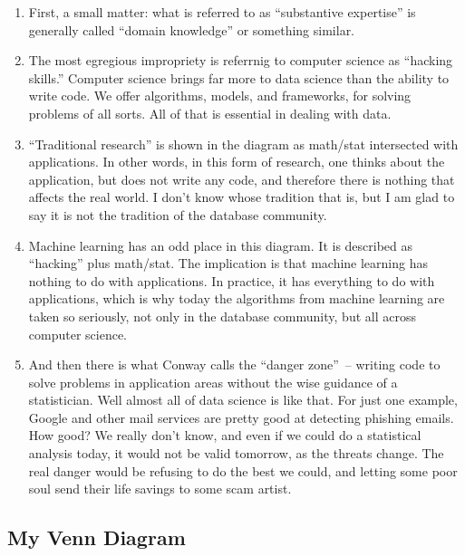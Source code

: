 \documentclass[11pt]{article}
\begin{document}
\begin{enumerate}

\item
First, a small matter: what is referred to as ``substantive expertise'' is generally called ``domain knowledge'' or something similar.

\item
The most egregious impropriety is referrnig to computer science as ``hacking skills.''  Computer science brings far more to data science than the ability to write code.  We offer algorithms, models, and frameworks, for solving problems of all sorts.  All of that is essential in dealing with data.

\item
``Traditional research'' is shown in the diagram as math/stat intersected with applications.  In other words, in this form of research, one thinks about the application, but does not write any code, and therefore there is nothing that affects the real world.  I don't know whose tradition that is, but I am glad to say it is not the tradition of the database community.

\item
Machine learning has an odd place in this diagram.  It is described as ``hacking'' plus math/stat.  The implication is that machine learning has nothing to do with applications.  In practice, it has everything to do with applications, which is why today the algorithms from machine learning are taken so seriously, not only in the database community, but all across computer science.

\item
And then there is what Conway calls the ``danger zone''~-- writing code to solve problems in application areas without the wise guidance of a statistician.  Well almost all of data science is like that.  For just one example, Google and other mail services are pretty good at detecting phishing emails.  How good?  We really don't know, and even if we could do a statistical analysis today, it would not be valid tomorrow, as the threats change.  The real danger would be refusing to do the best we could, and letting some poor soul send their life savings to some scam artist.

\end{enumerate}

\subsection{My Venn Diagram}
\end{document}
